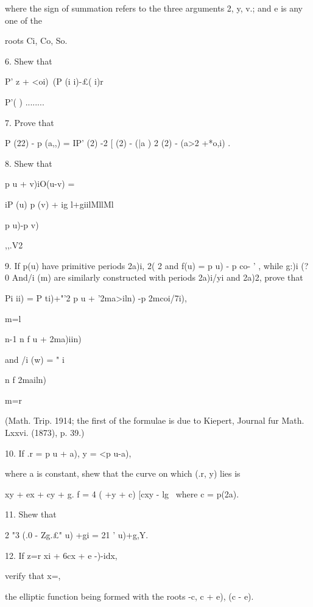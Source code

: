 {where the sign of summation refers to the three arguments 2, y, v.;
and e is any one of the

roots Ci, Co, So.


6. Shew that

P' z + <oi)\ (P (i i)-£( i)r

P'( ) ........


7. Prove that

P (22) - p (a,,) = IP' (2) -2 [ (2) - (|a ) 2 (2) - (a>2 +*o,i) .


8. Shew that

p u + v)iO(u-v) =

iP (u) p (v) + ig l+giilMllMl

 p u)-p v)

,,.V2


9. If p(u) have primitive periods 2a)i, 2( 2 and f(u) = p u) - p co- '
, while g:)i (?0 And/i (m) are similarly constructed with periods
2a)i/yi and 2a)2, prove that

Pi ii) = P ti)+"'2 p u + '2ma>iln) -p 2mcoi/7i),

m=l

n-1 n f u + 2ma)iin)

 and /i (w) = " i

n f 2mailn)

m=r

(Math. Trip. 1914; the first of the formulae is due to Kiepert,
Journal fur Math. Lxxvi. (1873), p. 39.)

%
%

10. If .r = p u + a), y = <p u-a),

where a is constant, shew that the curve on which (.r, y) lies is

 xy + ex + cy + g. f = 4 ( +y + c) [cxy - lg \ where c = p(2a).


11. Shew that

2 "3 (.0 - Zg.£" u) +gi = 21 ' u)+g,Y.

12. If z=r xi + 6cx + e -)-idx,

verify that x=,

the elliptic function being formed with the roots -c, c + e), (c - e).

}
